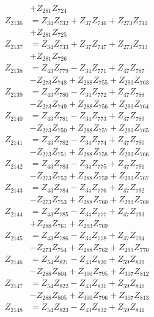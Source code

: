 \begin{multicols}{2}
\begin{align}
&+ Z_{281}Z_{724} \nonumber \\
Z_{2136} &= Z_{34}Z_{732} + Z_{37}Z_{746} + Z_{273}Z_{712}  \nonumber \\
&+ Z_{281}Z_{725} \nonumber \\
Z_{2137} &= Z_{34}Z_{733} + Z_{37}Z_{747} + Z_{273}Z_{713}  \nonumber \\
&+ Z_{281}Z_{726} \nonumber \\
Z_{2138} &= Z_{43}Z_{779} - Z_{34}Z_{771} + Z_{47}Z_{787}  \nonumber \\
&- Z_{273}Z_{748} + Z_{288}Z_{755} + Z_{293}Z_{763} \nonumber \\
Z_{2139} &= Z_{43}Z_{780} - Z_{34}Z_{772} + Z_{47}Z_{788}  \nonumber \\
&- Z_{273}Z_{749} + Z_{288}Z_{756} + Z_{293}Z_{764} \nonumber \\
Z_{2140} &= Z_{43}Z_{781} - Z_{34}Z_{773} + Z_{47}Z_{789}  \nonumber \\
&- Z_{273}Z_{750} + Z_{288}Z_{757} + Z_{293}Z_{765} \nonumber \\
Z_{2141} &= Z_{43}Z_{782} - Z_{34}Z_{774} + Z_{47}Z_{790}  \nonumber \\
&- Z_{273}Z_{751} + Z_{288}Z_{758} + Z_{293}Z_{766} \nonumber \\
Z_{2142} &= Z_{43}Z_{783} - Z_{34}Z_{775} + Z_{47}Z_{791}  \nonumber \\
&- Z_{273}Z_{752} + Z_{288}Z_{759} + Z_{293}Z_{767} \nonumber \\
Z_{2143} &= Z_{43}Z_{784} - Z_{34}Z_{776} + Z_{47}Z_{792}  \nonumber \\
&- Z_{273}Z_{753} + Z_{288}Z_{760} + Z_{293}Z_{768} \nonumber \\
Z_{2144} &= Z_{43}Z_{785} - Z_{34}Z_{777} + Z_{47}Z_{793}  \nonumber \\
&+ Z_{288}Z_{761} + Z_{293}Z_{769} \nonumber \\
Z_{2145} &= Z_{43}Z_{786} - Z_{34}Z_{778} + Z_{47}Z_{794}  \nonumber \\
&- Z_{273}Z_{754} + Z_{288}Z_{762} + Z_{293}Z_{770} \nonumber \\
Z_{2146} &= Z_{54}Z_{821} - Z_{43}Z_{830} + Z_{59}Z_{839}  \nonumber \\
&- Z_{288}Z_{804} + Z_{300}Z_{795} + Z_{307}Z_{812} \nonumber \\
Z_{2147} &= Z_{54}Z_{822} - Z_{43}Z_{831} + Z_{59}Z_{840}  \nonumber \\
&- Z_{288}Z_{805} + Z_{300}Z_{796} + Z_{307}Z_{813} \nonumber \\
Z_{2148} &= Z_{54}Z_{823} - Z_{43}Z_{832} + Z_{59}Z_{841}  \nonumber \\

\end{align}
\end{multicols}

